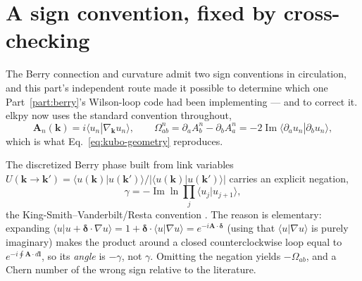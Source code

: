 \documentclass[11pt]{article}
\begin{document}
\section{A sign convention, fixed by cross-checking}

The Berry connection and curvature admit two sign conventions in circulation, and this
part's independent route made it possible to determine which one
Part~\ref{part:berry}'s Wilson-loop code had been implementing --- and to correct it.
elkpy now uses the standard convention \cite{xiaochangniu2010} throughout,
\begin{equation}
  \mathbf A_n(\mathbf k)=i\langle u_n|\nabla_{\mathbf k}u_n\rangle,
  \qquad
  \Omega^n_{ab}=\partial_a A^n_b-\partial_b A^n_a
              = -2\operatorname{Im}\langle\partial_a u_n|\partial_b u_n\rangle,
  \label{eq:standard-omega}
\end{equation}
which is what Eq.~\eqref{eq:kubo-geometry} reproduces.

The discretized Berry phase built from link variables
$U(\mathbf k\to\mathbf k')=\langle u(\mathbf k)|u(\mathbf k')\rangle/
|\langle u(\mathbf k)|u(\mathbf k')\rangle|$ carries an explicit negation,
\begin{equation}
  \gamma = -\operatorname{Im}\ln\prod_j\langle u_j|u_{j+1}\rangle,
  \label{eq:discrete-berry}
\end{equation}
the King-Smith--Vanderbilt/Resta convention \cite{ksv1993}. The reason is elementary:
expanding $\langle u|u+\boldsymbol\delta\cdot\nabla u\rangle
=1+\boldsymbol\delta\cdot\langle u|\nabla u\rangle=e^{-i\mathbf A\cdot\boldsymbol\delta}$
(using that $\langle u|\nabla u\rangle$ is purely imaginary) makes the product around a
closed counterclockwise loop equal to $e^{-i\oint\mathbf A\cdot d\mathbf l}$, so its
\emph{angle} is $-\gamma$, not $\gamma$. Omitting the negation yields $-\Omega_{ab}$, and
a Chern number of the wrong sign relative to the literature.
\end{document}
